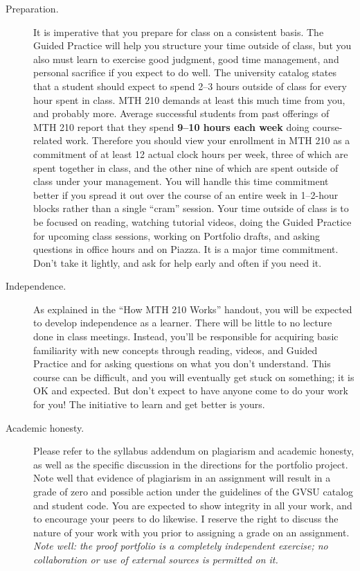\documentclass[11pt]{article}
\begin{document}
\begin{description}
	\item[Preparation.] It is imperative that you prepare for class on a consistent basis. The Guided Practice will help you structure your time outside of class, but you also must learn to exercise good judgment, good time management, and personal sacrifice if you expect to do well. The university catalog states that a student should expect to spend 2--3 hours outside of class for every hour spent in class.  MTH 210 demands at least this much time from you, and probably more. Average successful students from past offerings of MTH 210 report that they spend \textbf{9--10 hours each week} doing course-related work. Therefore you should view your enrollment in MTH 210 as a commitment of at least 12 actual clock hours per week, three of which are spent together in class, and the other nine of which are spent outside of class under your management. You will handle this time commitment better if you spread it out over the course of an entire week in 1--2-hour blocks rather than a single ``cram'' session. Your time outside of class is to be focused on reading, watching tutorial videos, doing the Guided Practice for upcoming class sessions, working on Portfolio drafts, and asking questions in office hours and on Piazza. It is a major time commitment. Don't take it lightly, and ask for help early and often if you need it. 
	\item[Independence.] As explained in the ``How MTH 210 Works'' handout, you will be expected to develop independence as a learner. There will be little to no lecture done in class meetings. Instead, you'll be responsible for acquiring basic familiarity with new concepts through reading, videos, and Guided Practice and for asking questions on what you don't understand. This course can be difficult, and you will eventually get stuck on something; it is OK and expected. But don't expect to have anyone come to do your work for you! The initiative to learn and get better is yours. 
	\item[Academic honesty.] Please refer to the syllabus addendum on plagiarism and academic honesty, as well as the specific discussion in the directions for the portfolio project.  Note well that evidence of plagiarism in an assignment will result in a grade of zero and possible action under the guidelines of the GVSU catalog and student code.  You are expected to show integrity in all your work, and to encourage your peers to do likewise.  I reserve the right to discuss the nature of your work with you prior to assigning a grade on an assignment.   \emph{Note well: the proof portfolio is a completely independent exercise; no collaboration or use of external sources is permitted on it.} 

\end{description}
\end{document}
